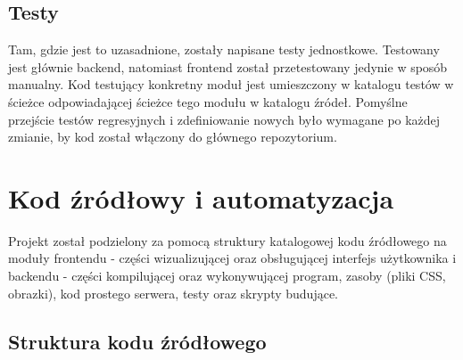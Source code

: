 \documentclass[a4paper,twoside,openright,11pt]{report}
\begin{document}
  \section{Testy}
\par Tam, gdzie jest to uzasadnione, zostały napisane testy jednostkowe. Testowany jest głównie backend, natomiast frontend został przetestowany jedynie w sposób manualny.  Kod testujący konkretny moduł jest umieszczony w katalogu testów w ścieżce odpowiadającej ścieżce tego modułu w katalogu źródeł. Pomyślne przejście testów regresyjnych i zdefiniowanie nowych było wymagane po każdej zmianie, by kod został włączony do głównego repozytorium.

  \chapter {Kod źródłowy i automatyzacja}
\par Projekt został podzielony za pomocą struktury katalogowej kodu źródłowego na moduły frontendu - części wizualizującej oraz obsługującej interfejs użytkownika i backendu - części kompilującej oraz wykonywującej program, zasoby (pliki CSS, obrazki), kod prostego serwera, testy oraz skrypty budujące. 

  \section{Struktura kodu źródłowego}
\end{document}
